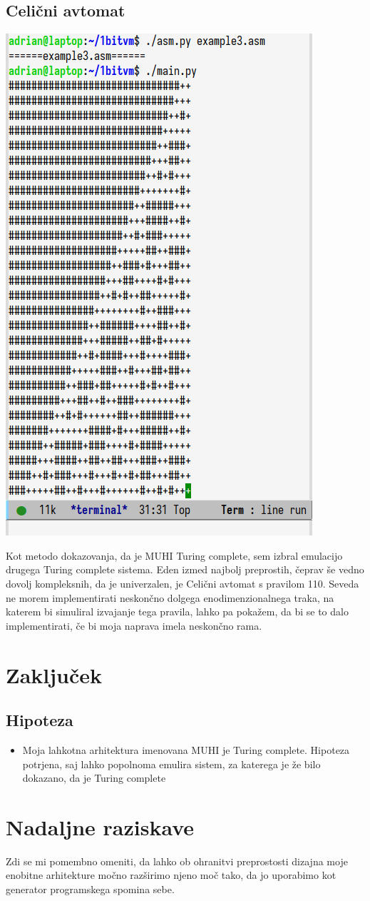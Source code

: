 \documentclass[12pt]{article}
\begin{document}
\subsection{Celični avtomat}
\begin{center}
  \includegraphics[width=.3\linewidth]{slike/pravilo110.png}
\end{center}
Kot metodo dokazovanja, da je MUHI Turing complete, sem izbral emulacijo drugega Turing complete sistema.
Eden izmed najbolj preprostih, čeprav še vedno dovolj kompleksnih, da je univerzalen, je Celični avtomat s pravilom 110.
Seveda ne morem implementirati neskončno dolgega enodimenzionalnega traka, na katerem bi simuliral izvajanje tega pravila, lahko pa pokažem, da bi se to dalo implementirati, če bi moja naprava imela neskončno rama.

\section{Zaključek}
\subsection{Hipoteza}
\begin{itemize}
  \item Moja lahkotna arhitektura imenovana MUHI je Turing complete.
  Hipoteza potrjena, saj lahko popolnoma emulira sistem, za katerega je že bilo dokazano, da je Turing complete
\end{itemize}

\section{Nadaljne raziskave}
Zdi se mi pomembno omeniti, da lahko ob ohranitvi preprostosti dizajna moje enobitne arhitekture močno razširimo njeno moč tako, da jo uporabimo kot generator programskega spomina sebe.
\end{document}
